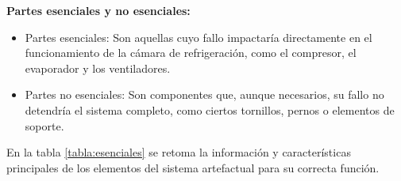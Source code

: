 \textbf{Partes esenciales y no esenciales:}
\begin{itemize}
	\item Partes esenciales: Son aquellas cuyo fallo impactaría directamente en el funcionamiento de la cámara de refrigeración, como el compresor, el evaporador y los ventiladores.
	
\item Partes no esenciales: Son componentes que, aunque necesarios, su fallo no detendría el sistema completo, como ciertos tornillos, pernos o elementos de soporte.
\end{itemize}

\newpage

\begin{landscape}
En la tabla \ref{tabla:esenciales} se retoma la información y características principales de los elementos del sistema
artefactual para su correcta función.



\end{landscape}

